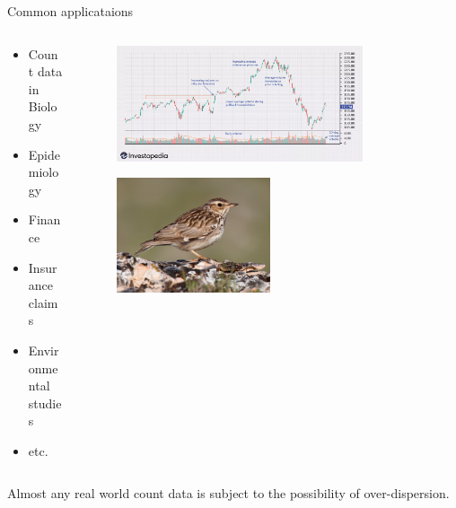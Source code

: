 \documentclass[
  ignorenonframetext,
]{beamer}
\providecommand{\tightlist}{%
  \setlength{\itemsep}{0pt}\setlength{\parskip}{0pt}}\usepackage{longtable,booktabs,array}
\begin{document}
\begin{frame}{Common applicataions}
\protect\hypertarget{common-applicataions}{}
\begin{columns}[T]
\begin{column}{0.5\textwidth}
\begin{itemize}
\tightlist
\item
  Count data in Biology
\item
  Epidemiology
\item
  Finance
\item
  Insurance claims
\item
  Environmental studies
\item
  etc.
\end{itemize}
\end{column}

\begin{column}{0.5\textwidth}
\begin{figure}

{\centering \includegraphics[width=0.8\textwidth,height=\textheight]{daily_stock_trades.png}

}

\end{figure}

\begin{figure}

{\centering \includegraphics[width=0.5\textwidth,height=\textheight]{woodlark.png}

}

\end{figure}
\end{column}
\end{columns}

Almost any real world count data is subject to the possibility of
over-dispersion.
\end{frame}
\end{document}
